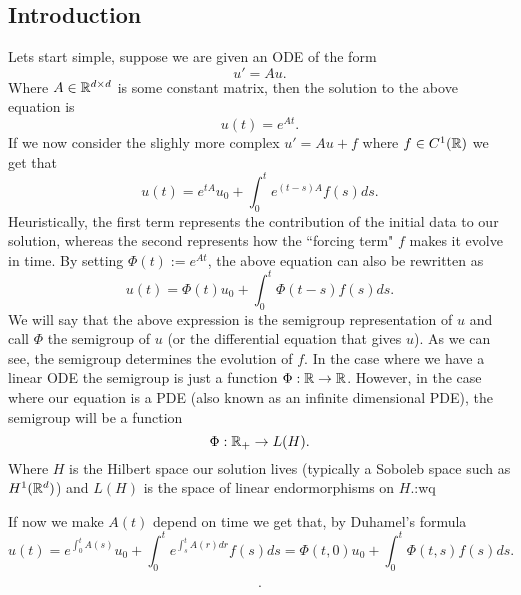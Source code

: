 \documentclass[12pt]{article}
\begin{document}
\begin{CJK*}{UTF8}{gbsn}
	\section{Introduction}
	Lets start simple, suppose we are given an ODE of the form
	\begin{equation*}
		u'=Au.
	\end{equation*}
	Where $A\in {\mathbb R}^{d\times d}$ is some constant matrix, then the solution to the above equation is
	\begin{equation*}
		u(t)=e^{At}.
	\end{equation*}
	If we now consider the slighly more complex $u'=Au+f$ where  $f\in C^1({\mathbb R})$ we get that
	\begin{equation*}
		u(t)=e^{tA}u_0+\int_{0}^t e^{(t-s)A}f(s) ds.
	\end{equation*}
	Heuristically, the first term represents the contribution of the initial data to our solution, whereas the second represents how the ``forcing term" $f$ makes it evolve in time. By setting $\Phi(t):=e^{At}$,
	the above equation can also be rewritten as
	\begin{equation*}
		u(t)=\Phi(t)u_0+\int_{0}^t\Phi(t-s)f(s) ds.
	\end{equation*}
	We will say that the above expression is the semigroup representation of $u$ and call $\Phi$ the semigroup of $u$ (or the differential equation that gives $u$). As we can see,
	the semigroup determines the evolution of $f$. In the case where we have a linear ODE the semigroup is just a function $\Phi:{\mathbb R}\to{\mathbb R}$. However, in the case where our
	equation is a PDE (also known as an infinite dimensional PDE), the semigroup will be a function
	\begin{equation*}
		\Phi:{\mathbb R}_+\to L(H).
	\end{equation*}
	Where $H$ is the Hilbert space our solution lives  (typically a Soboleb space such as $H^1({\mathbb R}^d)$) and  $L(H)$ is the space of linear endormorphisms on $H$.:wq




	If now we make $A(t)$ depend on time we get that, by Duhamel's formula
	\begin{equation*}
		u(t)=e^{\int_{0}^tA(s)}u_0+\int_{0}^t e^{\int_{s}^t A(r)dr}f(s) ds=\Phi(t,0)u_0+\int_{0}^t \Phi(t,s)f(s)ds.
	\end{equation*}



	\begin{equation*}
		.
	\end{equation*}



\end{CJK*}




\end{document}
